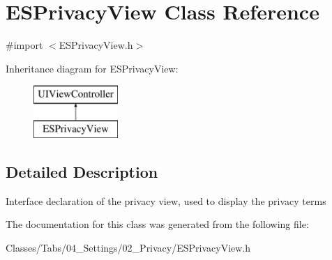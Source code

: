 \hypertarget{interface_e_s_privacy_view}{}\section{E\+S\+Privacy\+View Class Reference}
\label{interface_e_s_privacy_view}


{\ttfamily \#import $<$E\+S\+Privacy\+View.\+h$>$}

Inheritance diagram for E\+S\+Privacy\+View\+:\begin{figure}[H]
\begin{center}
\leavevmode
\includegraphics[height=2.000000cm]{interface_e_s_privacy_view}
\end{center}
\end{figure}


\subsection{Detailed Description}
Interface declaration of the privacy view, used to display the privacy terms 

The documentation for this class was generated from the following file\+:\begin{DoxyCompactItemize}
\item 
Classes/\+Tabs/04\+\_\+\+Settings/02\+\_\+\+Privacy/E\+S\+Privacy\+View.\+h\end{DoxyCompactItemize}

